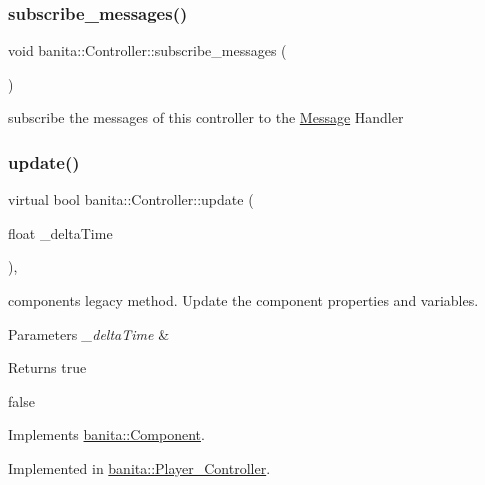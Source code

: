 \subsubsection{\texorpdfstring{subscribe\_messages()}{subscribe\_messages()}}
{\footnotesize\ttfamily void banita\+::\+Controller\+::subscribe\+\_\+messages (\begin{DoxyParamCaption}{ }\end{DoxyParamCaption})}



subscribe the messages of this controller to the \mbox{\hyperlink{classbanita_1_1_message}{Message}} Handler 

\mbox{\label{classbanita_1_1_controller_a44363ca0ed1ba66a9f6c079a6b158d94}} 
\subsubsection{\texorpdfstring{update()}{update()}}
{\footnotesize\ttfamily virtual bool banita\+::\+Controller\+::update (\begin{DoxyParamCaption}\item[{float}]{\+\_\+delta\+Time }\end{DoxyParamCaption})\hspace{0.3cm}{\ttfamily [override]}, {}}



component\textquotesingle{}s legacy method. Update the component properties and variables. 


\begin{DoxyParams}{Parameters}
{\em \+\_\+delta\+Time} & \\
\hline
\end{DoxyParams}
\begin{DoxyReturn}{Returns}
true 

false 
\end{DoxyReturn}


Implements \mbox{\hyperlink{classbanita_1_1_component_ae8f9d11dc8e3c920d6d40146668c429b}{banita\+::\+Component}}.



Implemented in \mbox{\hyperlink{classbanita_1_1_player___controller_ab7c47cba21892cac0e9f8a366cf86ca8}{banita\+::\+Player\+\_\+\+Controller}}.



